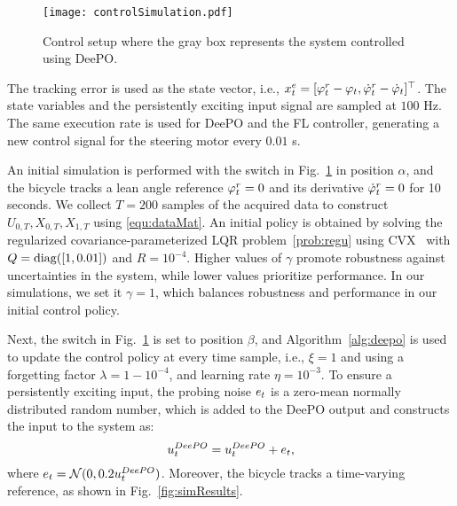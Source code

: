 \begin{figure}[t]
    \centering
    \texttt{[image: controlSimulation.pdf]}
    \caption{Control setup where the gray box represents the system controlled using DeePO.}
    \label{fig:ControlStructure}
\end{figure}

The tracking error is used as the state vector, i.e., $x_{t}^{e} = [\varphi_{t}^{r} - \varphi_{t}, \dot\varphi_{t}^{r} -\dot\varphi_{t}]^\top$. The state variables and the persistently exciting input signal are sampled at $100$ Hz. The same execution rate is used for DeePO and the FL controller, generating a new control signal for the steering motor every $0.01$ s.

An initial simulation is performed with the switch in Fig.~\ref{fig:ControlStructure} in position $\alpha$, and the bicycle tracks a lean angle reference $\varphi_{t}^{r}=0$ and its derivative $\dot\varphi_{t}^{r}=0$ for 10 seconds.  We collect $T=200$ samples of the acquired data to construct $U_{0,T}, X_{0,T}, X_{1,T}$ using \eqref{equ:dataMat}. An initial policy is obtained by solving the regularized covariance-parameterized LQR problem~\eqref{prob:regu} using CVX~\cite{cvx} with $Q=\operatorname{diag}([1,0.01])$ and $R=10^{-4}$. Higher values of $\gamma$ promote robustness against uncertainties in the system, while lower values prioritize performance. In our simulations, we set it $\gamma = 1$, which balances robustness and performance in our initial control policy. 
 
 Next, the switch in Fig.~\ref{fig:ControlStructure} is set to position $\beta$, and Algorithm~\ref{alg:deepo} is used to update the control policy at every time sample, i.e., $\xi=1$ and using a forgetting factor $\lambda = 1-10^{-4}$, and learning rate $\eta=10^{-3}$. To ensure a persistently exciting input, the probing noise $e_{t}$ is a zero-mean normally distributed random number, which is added to the DeePO output and constructs the input to the system as:
\begin{equation}
    u_{t}^{DeePO} = u_{t}^{DeePO} + e_{t},
\end{equation}
where $e_{t}=\mathcal{N}(0,0.2u_{t}^{DeePO})$. Moreover, the bicycle tracks a time-varying reference, as shown in Fig.~\ref{fig:simResults}.


